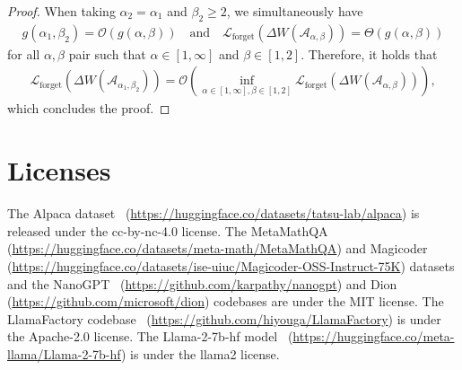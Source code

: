 \documentclass{article}
\theoremstyle{remark}
\newcommand{\cO}{\mathcal{O}}
\newcommand{\cA}{\mathcal{A}}
\newcommand{\Lforget}{\mathcal{L}_{\mathrm{forget}}}
\begin{document}
\begin{proof}
    When taking $\alpha_2=\alpha_1$ and $\beta_2 \ge 2$, we simultaneously have
    \begin{align*}
        g(\alpha_1,\beta_2) =\cO\left( g(\alpha, \beta) \right) \quad \text{and} \quad \Lforget(\Delta W(\cA_{\alpha,\beta})) = \Theta\left( g(\alpha,\beta) \right)
    \end{align*}
    for all $\alpha,\beta$ pair such that $\alpha\in[1,\infty]$ and $\beta \in [1,2]$. Therefore, it holds that
    \begin{align*}
        \Lforget(\Delta W(\cA_{\alpha_1,\beta_2})) = \cO\left( \inf_{\alpha\in[1,\infty],\beta \in [1,2]} \Lforget(\Delta W(\cA_{\alpha,\beta})) \right) ,
    \end{align*}
    which concludes the proof.
    
\end{proof}

        
    
    


\section{Licenses}\label{appendix:licenses}
The Alpaca dataset~\citep{alpaca} (\url{https://huggingface.co/datasets/tatsu-lab/alpaca}) is released under the cc-by-nc-4.0 license. The MetaMathQA~\citep{yu2023metamath} (\url{https://huggingface.co/datasets/meta-math/MetaMathQA}) and Magicoder~\citep{wei2023magicoder} (\url{https://huggingface.co/datasets/ise-uiuc/Magicoder-OSS-Instruct-75K}) datasets and the NanoGPT~\citep{karpathy2022nanogpt} (\url{https://github.com/karpathy/nanogpt}) and Dion~\citep{ahn2025dion,ahn2025dion2} (\url{https://github.com/microsoft/dion}) codebases are under the MIT license. The LlamaFactory codebase~\citep{zheng2024llamafactory} (\url{https://github.com/hiyouga/LlamaFactory}) is under the Apache-2.0 license. The Llama-2-7b-hf model~\citep{touvron2023llama} (\url{https://huggingface.co/meta-llama/Llama-2-7b-hf}) is under the llama2 license.
\end{document}
